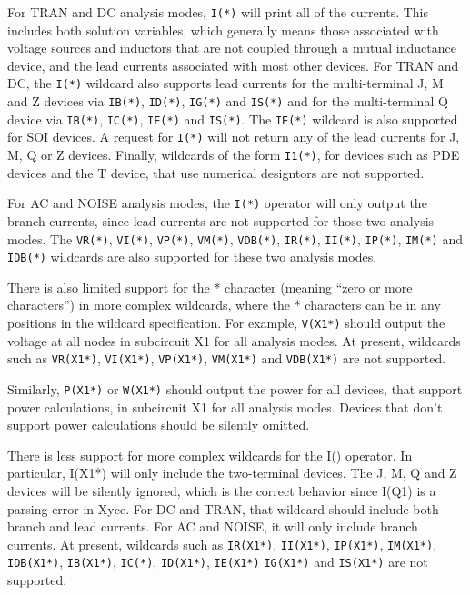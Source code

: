For TRAN and DC analysis modes, \texttt{I(*)} will print all of the
currents.  This includes both solution variables, which generally means those
associated  with voltage sources and inductors that are not coupled through
a mutual inductance device, and the lead currents associated with most
other devices.  For TRAN and DC, the \texttt{I(*)} wildcard also supports
lead currents for the multi-terminal J, M and Z devices via
\texttt{IB(*)}, \texttt{ID(*)}, \texttt{IG(*)} and \texttt{IS(*)} and 
for the multi-terminal Q device via \texttt{IB(*)}, \texttt{IC(*)}, \texttt{IE(*)}
and \texttt{IS(*)}.  The \texttt{IE(*)} wildcard is also supported for SOI
devices.  A  request for \texttt{I(*)} will not return any of the lead currents
for  J, M, Q or Z devices.  Finally, wildcards of the form \texttt{I1(*)},
for devices such as PDE devices and the T device, that use numerical designtors
are not supported.

For AC and NOISE analysis modes, the \texttt{I(*)} operator will only output
the branch currents, since lead currents are not supported for those two
analysis modes.  The \texttt{VR(*)}, \texttt{VI(*)}, \texttt{VP(*)},
\texttt{VM(*)}, \texttt{VDB(*)}, \texttt{IR(*)}, \texttt{II(*)},
\texttt{IP(*)}, \texttt{IM(*)} and \texttt{IDB(*)} wildcards are also
supported for these two analysis modes.

There is also limited support for the * character (meaning ``zero or more
characters'') in more complex wildcards, where the * characters can be in
any positions in the wildcard specification.  For example, \texttt{V(X1*)}
should output the voltage at all nodes in subcircuit X1 for all analysis
modes.  At present, wildcards such as \texttt{VR(X1*)}, \texttt{VI(X1*)},
\texttt{VP(X1*)}, \texttt{VM(X1*)} and \texttt{VDB(X1*)} are not supported.

Similarly, \texttt{P(X1*)} or \texttt{W(X1*)} should output the
power for all devices, that support power calculations, in subcircuit X1
for all analysis modes.  Devices that don't support power calculations
should be silently omitted.

There is less support for more complex wildcards for the I()
operator.  In particular, I(X1*) will only include the two-terminal
devices.  The J, M, Q and Z devices will be silently ignored,
which is the correct behavior since I(Q1) is a parsing error in Xyce.
For DC and TRAN, that wildcard should include both branch and lead
currents.  For AC and NOISE, it will only include branch currents. At
present, wildcards such as \texttt{IR(X1*)}, \texttt{II(X1*)},
\texttt{IP(X1*)}, \texttt{IM(X1*)}, \texttt{IDB(X1*)}, \texttt{IB(X1*)},
\texttt{IC(*)}, \texttt{ID(X1*)}, \texttt{IE(X1*)} \texttt{IG(X1*)} and
\texttt{IS(X1*)} are not supported.

